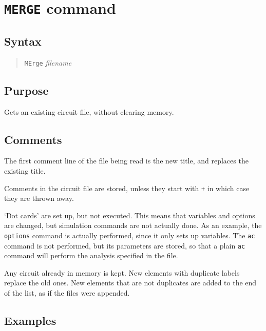 \section{{\tt MERGE} command}
\subsection{Syntax}
\begin{verse}
{\tt MErge} {\it filename}
\end{verse}
\subsection{Purpose}

Gets an existing circuit file, without clearing memory.
\subsection{Comments}

The first comment line of the file being read is the new title, and replaces
the existing title.

Comments in the circuit file are stored, unless they start with {\tt *+} in
which case they are thrown away.

`Dot cards' are set up, but not executed.  This means that variables and
options are changed, but simulation commands are not actually done.  As
an example, the {\tt options} command is actually performed, since it only
sets up variables.  The {\tt ac} command is not performed, but its parameters
are stored, so that a plain {\tt ac} command will perform the analysis
specified in the file.

Any circuit already in memory is kept.  New elements with duplicate labels
replace the old ones.  New elements that are not duplicates are added to the
end of the list, as if the files were appended.
\subsection{Examples}

